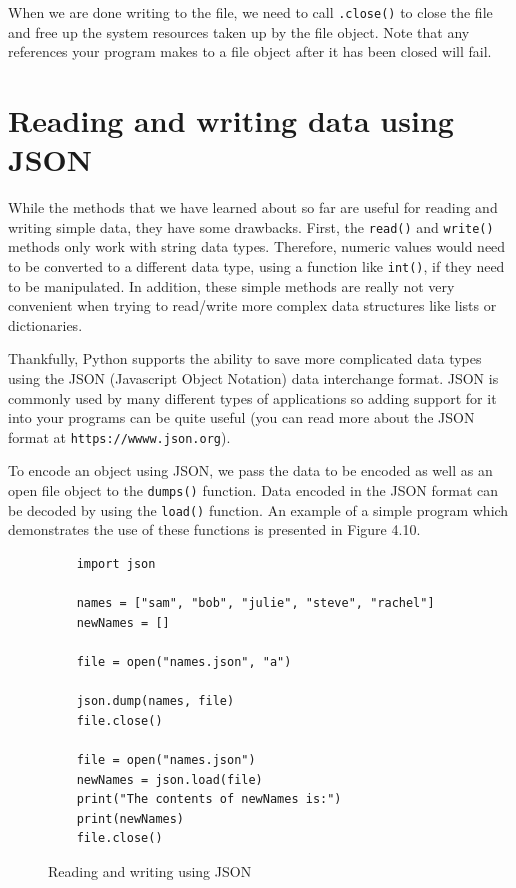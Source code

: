 \documentclass{book}
\begin{document}
When we are done writing to the file, we need to call \texttt{.close()} to close the file and free up the system resources taken up by the file object. Note that any references your program makes to a file object after it has been closed will fail. 

\section{Reading and writing data using JSON}

While the methods that we have learned about so far are useful for reading and writing simple data, they have some drawbacks. First, the \texttt{read()} and \texttt{write()} methods only work with string data types. Therefore, numeric values would need to be converted to a different data type, using a function like \texttt{int()}, if they need to be manipulated. In addition, these simple methods are really not very convenient when trying to read/write more complex data structures like lists or dictionaries. 

Thankfully, Python supports the ability to save more complicated data types using the JSON (Javascript Object Notation) data interchange format. JSON is commonly used by many different types of applications so adding support for it into your programs can be quite useful (you can read more about the JSON format at \texttt{https://wwww.json.org}).

To encode an object using JSON, we pass the data to be encoded as well as an open file object to the \texttt{dumps()} function. Data encoded in the JSON format can be decoded by using the \texttt{load()} function. An example of a simple program which demonstrates the use of these functions is presented in Figure 4.10.

\begin{figure}[h]
	\caption{Reading and writing using JSON}
	\begin{lstlisting}
	import json
	
	names = ["sam", "bob", "julie", "steve", "rachel"]
	newNames = []
	
	file = open("names.json", "a")
	
	json.dump(names, file)
	file.close()
	
	file = open("names.json")
	newNames = json.load(file)
	print("The contents of newNames is:")
	print(newNames)
	file.close()
	\end{lstlisting}
\end{figure}
\end{document}
